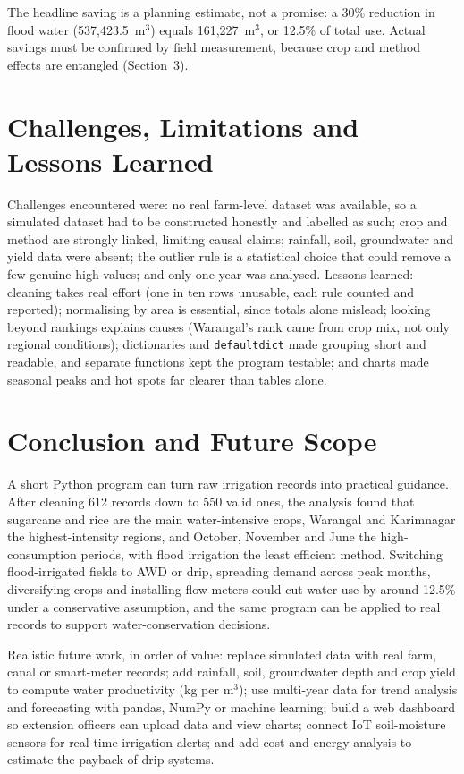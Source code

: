 \documentclass[11pt,a4paper]{article}
\begin{document}
The headline saving is a planning estimate, not a promise: a 30\% reduction in flood
water (537,423.5~m$^3$) equals 161,227~m$^3$, or 12.5\% of total use. Actual savings
must be confirmed by field measurement, because crop and method effects are entangled
(Section~3).

\section{Challenges, Limitations and Lessons Learned}
Challenges encountered were: no real farm-level dataset was available, so a simulated
dataset had to be constructed honestly and labelled as such; crop and method are
strongly linked, limiting causal claims; rainfall, soil, groundwater and yield data
were absent; the outlier rule is a statistical choice that could remove a few genuine
high values; and only one year was analysed. Lessons learned: cleaning takes real
effort (one in ten rows unusable, each rule counted and reported); normalising by area
is essential, since totals alone mislead; looking beyond rankings explains causes
(Warangal's rank came from crop mix, not only regional conditions); dictionaries and
\texttt{defaultdict} made grouping short and readable, and separate functions kept
the program testable; and charts made seasonal peaks and hot spots far clearer than
tables alone.

\section{Conclusion and Future Scope}
A short Python program can turn raw irrigation records into practical guidance. After
cleaning 612 records down to 550 valid ones, the analysis found that sugarcane and
rice are the main water-intensive crops, Warangal and Karimnagar the highest-intensity
regions, and October, November and June the high-consumption periods, with flood
irrigation the least efficient method. Switching flood-irrigated fields to AWD or drip,
spreading demand across peak months, diversifying crops and installing flow meters
could cut water use by around 12.5\% under a conservative assumption, and the same
program can be applied to real records to support water-conservation decisions.

Realistic future work, in order of value: replace simulated data with real farm, canal
or smart-meter records; add rainfall, soil, groundwater depth and crop yield to compute
water productivity (kg per m$^3$); use multi-year data for trend analysis and
forecasting with pandas, NumPy or machine learning; build a web dashboard so extension
officers can upload data and view charts; connect IoT soil-moisture sensors for
real-time irrigation alerts; and add cost and energy analysis to estimate the payback
of drip systems.
\end{document}
